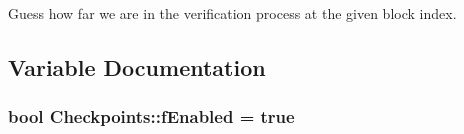 Guess how far we are in the verification process at the given block index. 



\subsection{Variable Documentation}
\hypertarget{namespace_checkpoints_ad0487227057b5fe806a9a78cdff587e7}{}
\subsubsection[{f\+Enabled}]{\setlength{\rightskip}{0pt plus 5cm}bool Checkpoints\+::f\+Enabled = true}\label{namespace_checkpoints_ad0487227057b5fe806a9a78cdff587e7}
